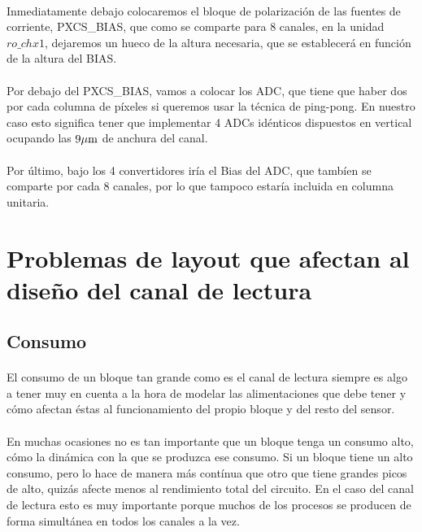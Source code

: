 \paragraph{}
Inmediatamente debajo colocaremos el bloque de polarización de las fuentes de
corriente, PXCS\_BIAS, que como se comparte para 8 canales, en la unidad $ro\_chx1$,
dejaremos un hueco de la altura necesaria, que se establecerá en función de la altura
del BIAS.

\paragraph{}
Por debajo del PXCS\_BIAS, vamos a colocar los ADC, que tiene que haber dos por
cada columna de píxeles si queremos usar la técnica de ping-pong. En nuestro caso
esto significa tener que implementar 4 ADCs idénticos dispuestos en vertical ocupando
las $9\mu\text{m}$ de anchura del canal.

\paragraph{}
Por último, bajo los 4 convertidores iría el Bias del ADC, que tambíen se comparte
por cada 8 canales, por lo que tampoco estaría incluida en columna unitaria.

\section{Problemas de layout que afectan al diseño del canal de lectura}

\subsection{Consumo}

\paragraph{}
El consumo de un bloque tan grande como es el canal de lectura siempre es algo a
tener muy en cuenta a la hora de modelar las alimentaciones que debe tener y
cómo afectan éstas al funcionamiento del propio bloque y del resto del sensor.

\paragraph{}
En muchas ocasiones no es tan importante que un bloque tenga un consumo alto,
cómo la dinámica con la que se produzca ese consumo. Si un bloque tiene un alto
consumo, pero lo hace de manera más contínua que otro que tiene grandes picos de
alto, quizás afecte menos al rendimiento total del circuito. En el caso del
canal de lectura esto es muy importante porque muchos de los procesos se producen
de forma simultánea en todos los canales a la vez.


